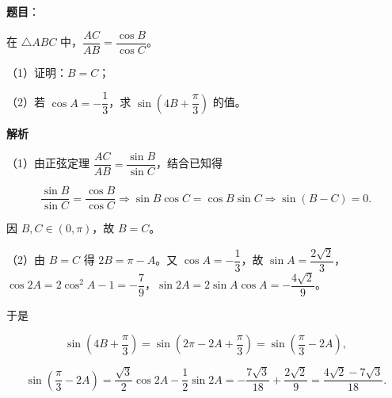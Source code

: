 \begin{answer}

\textbf{题目}：

在 $\triangle ABC$ 中，$\dfrac{AC}{AB}=\dfrac{\cos B}{\cos C}$。

（1）证明：$B=C$；

（2）若 $\cos A=-\dfrac13$，求 $\sin\left(4B+\dfrac\pi3\right)$ 的值。

\textbf{解析}

（1）由正弦定理 $\dfrac{AC}{AB}=\dfrac{\sin B}{\sin C}$，结合已知得

\nopagebreak[4]
\[\frac{\sin B}{\sin C}=\frac{\cos B}{\cos C}
\Longrightarrow \sin B\cos C=\cos B\sin C
\Longrightarrow \sin(B-C)=0.\]

因 $B,C\in(0,\pi)$，故 $B=C$。

（2）由 $B=C$ 得 $2B=\pi-A$。又 $\cos A=-\dfrac13$，故 $\sin A=\dfrac{2\sqrt2}3$，$\cos2A=2\cos^2A-1=-\dfrac79$，$\sin2A=2\sin A\cos A=-\dfrac{4\sqrt2}9$。

于是

\nopagebreak[4]
\[\sin\left(4B+\frac\pi3\right)
=\sin\left(2\pi-2A+\frac\pi3\right)
=\sin\left(\frac\pi3-2A\right),\]

\nopagebreak[4]
\[\sin\left(\frac\pi3-2A\right)
=\frac{\sqrt3}2\cos2A-\frac12\sin2A
=-\frac{7\sqrt3}{18}+\frac{2\sqrt2}9
=\frac{4\sqrt2-7\sqrt3}{18}.\]


\end{answer}
